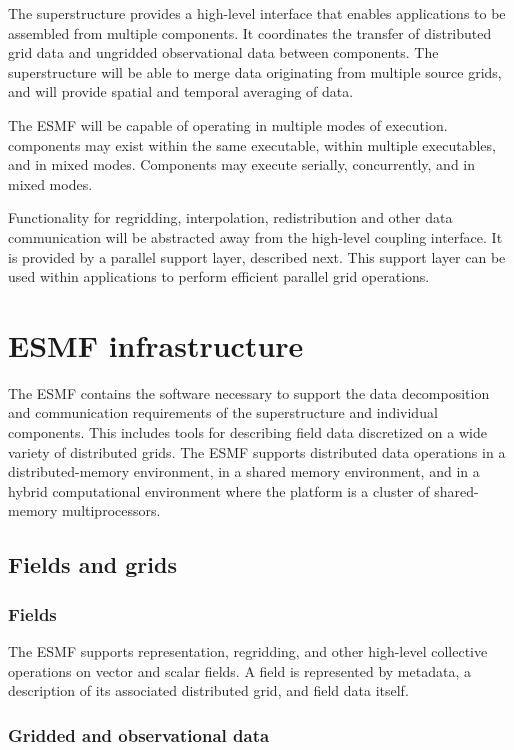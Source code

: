 The superstructure provides a high-level interface that enables 
applications to be assembled from multiple components.  It coordinates
the transfer of distributed grid data and ungridded 
observational data between components.  The superstructure will be able 
to merge data originating from multiple source grids, and will 
provide spatial and temporal averaging of data.

The ESMF will be capable of operating in multiple modes of execution.
components may exist within the same executable, within multiple 
executables, and in mixed modes.  Components may execute serially, 
concurrently, and in mixed modes.  

Functionality for regridding, interpolation, redistribution and other 
data communication will be abstracted away from the high-level coupling
interface.  It is provided by a parallel support layer, described next.  
This support layer can be used within applications 
to perform efficient parallel grid operations.

\section{ESMF infrastructure}
\label{sec:ESMF_infrastructure}

The ESMF contains the software necessary to support the data
decomposition and communication requirements of the superstructure and
individual components.  This includes tools for describing field
data discretized on a wide variety of distributed grids.  The ESMF
supports distributed data operations in a distributed-memory environment, 
in a shared memory environment, and in a hybrid computational environment 
where the platform is a cluster of shared-memory multiprocessors.

\subsection{Fields and grids}

\subsubsection{Fields}
The ESMF supports representation, regridding, and other high-level
collective operations on vector and scalar fields.  A field is represented 
by metadata, a description of its associated distributed grid, and field 
data itself.

\subsubsection{Gridded and observational data}

